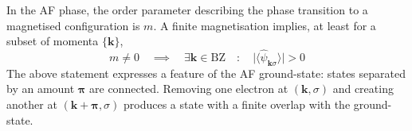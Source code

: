 In the AF phase, the order parameter describing the phase transition to a magnetised configuration is $m$. A finite magnetisation implies, at least for a subset of momenta $\lbrace \mathbf{k} \rbrace$,
\begin{equation}\label{eq:af-psi>0}
	m \neq 0
	\quad\implies\quad
	\exists \mathbf{k} \in \mathrm{BZ}
	\quad\colon\quad
	\big| \langle \hat \psi_{\mathbf{k}\sigma} \rangle  \big| > 0
\end{equation}
The above statement expresses a feature of the AF ground-state: states separated by an amount $\bm{\pi}$ are connected. Removing one electron at $(\mathbf{k},\sigma)$ and creating another at $(\mathbf{k}+\bm{\pi},\sigma)$ produces a state with a finite overlap with the ground-state.

\begin{tabproof}
	

\end{tabproof}
